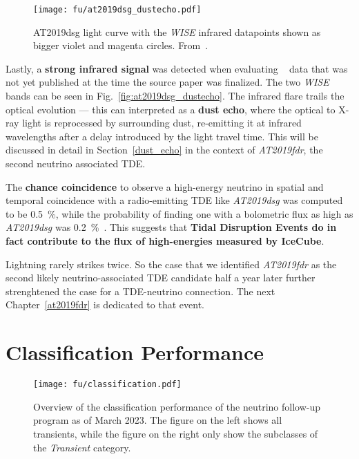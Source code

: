 \begin{figure}[htb]
    \texttt{[image: fu/at2019dsg\_dustecho.pdf]}
    \caption[AT2019dsg infrared light curve]{AT2019dsg light curve with the \textit{WISE} infrared datapoints shown as bigger violet and magenta circles. From~\cite{Reusch2023b}.}
\end{figure}

Lastly, a \textbf{strong infrared signal} was detected when evaluating ~ data that was not yet published at the time the source paper was finalized. The two \textit{WISE} bands can be seen in Fig.~\ref{fig:at2019dsg_dustecho}. The infrared flare trails the optical evolution --- this can interpreted as a \textbf{dust echo}, where the optical to X-ray light is reprocessed by surrounding dust, re-emitting it at infrared wavelengths after a delay introduced by the light travel time. This will be discussed in detail in Section~\ref{dust_echo} in the context of \emph{AT2019fdr}, the second neutrino associated TDE.

The \textbf{chance coincidence} to observe a high-energy neutrino in spatial and temporal coincidence with a radio-emitting TDE like \emph{AT2019dsg} was computed to be \SI{0.5}{\percent}, while the probability of finding one with a bolometric flux as high as \emph{AT2019dsg} was \SI{0.2}{\percent}~\cite{Stein2021}. This suggests that \textbf{Tidal Disruption Events do in fact contribute to the flux of high-energies measured by IceCube}.

Lightning rarely strikes twice. So the case that we identified \emph{AT2019fdr} as the second likely neutrino-associated TDE candidate half a year later further strenghtened the case for a TDE-neutrino connection. The next Chapter~\ref{at2019fdr} is dedicated to that event.

\section{Classification Performance}\label{classification_performance}

\begin{figure*}[htb]
    \texttt{[image: fu/classification.pdf]}
    \caption[Follow-up classification overview]{Overview of the classification performance of the neutrino follow-up program as of March 2023. The figure on the left shows all transients, while the figure on the right only show the subclasses of the \textit{Transient} category.}
\end{figure*}

